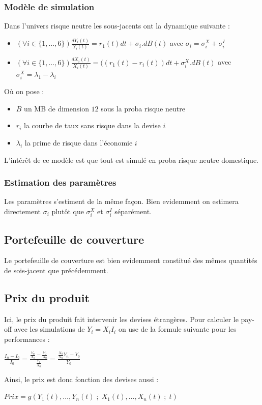 \documentclass[a4paper,12pt]{article}
\begin{document}
\subsubsection{Modèle de simulation}
Dans l'univers risque neutre les sous-jacents ont la dynamique suivante : 
\begin{itemize}[label=$\star$]
\item $\left(\forall i\in\{1,\ldots,6\}\right) \frac{dY_i(t)}{Y_i(t)}=r_1(t)dt + \sigma_i.dB(t)$ avec $\sigma_i=\sigma^X_i+\sigma^I_i$
\item $\left(\forall i\in\{1,\ldots,6\}\right) \frac{dX_i(t)}{X_i(t)}=((r_1(t)-r_i(t))dt+\sigma^X_i.dB(t)$ avec $\sigma^X_i= \lambda_1-\lambda_i$
\end{itemize}
Où on pose : 
\begin{itemize}[label=$\bullet$]
\item $B$ un MB de dimension $12$ sous la proba risque neutre
\item $r_i$ la courbe de taux sans risque dans la devise $i$
\item $\lambda_i$ la prime de risque dans l'économie $i$
\end{itemize}
L'intérêt de ce modèle est que tout est simulé en proba risque neutre domestique.
\subsubsection{Estimation des paramètres}
Les paramètres s'estiment de la même façon. Bien evidemment on estimera directement $\sigma_i$ plutôt que $\sigma^X_i$ et $\sigma^I_i$ séparément. 
\subsection{Portefeuille de couverture}
Le portefeuille de couverture est bien evidemment constitué des mêmes quantités de sois-jacent que précédemment.
\subsection{Prix du produit}
Ici, le prix du produit fait intervenir les devises étrangères. Pour calculer le pay-off avec les simulations de $Y_i=X_iI_i$ on use de la formule suivante pour les performances : 
\begin{center}
$\frac{I_n-I_0}{I_0}=\frac{\frac{Y_n}{X_n}-\frac{Y_0}{X_0}}{\frac{Y_0}{X_0}}=\frac{\frac{X_0}{X_n}Y_n-Y_0}{Y_0}$
\end{center}
Ainsi, le prix est donc fonction des devises aussi : 
\begin{center}
$Prix = g(Y_1(t),\ldots,Y_n(t)\;;\;X_1(t),\ldots,X_n(t)\;;\;t)$
\end{center}
\newpage
\end{document}
